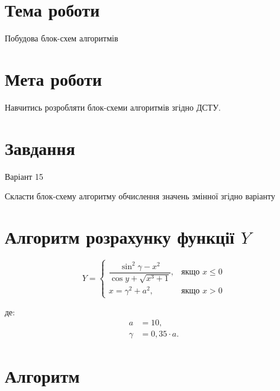 \documentclass[a4paper]{article}
\begin{document}
\section*{Тема роботи}
Побудова блок-схем алгоритмів

\section*{Мета роботи}
Навчитись розробляти блок-схеми алгоритмів згідно ДСТУ.

\section*{Завдання}
Варіант 15

Скласти блок-схему алгоритму обчислення значень змінної згідно варіанту



\section*{Алгоритм розрахунку функції $Y$}

\[
Y = 
\begin{cases}
\dfrac{\sin^2 \gamma - x^2}{\cos y + \sqrt{x^3 + 1}}, & \text{якщо } x \leq 0 \\
x = \gamma^2 + a^2, & \text{якщо } x > 0
\end{cases}
\]

\noindent
де: 
\begin{align*}
    a &= 10, \\
    \gamma &= 0{,}35 \cdot a.
\end{align*}

\section*{Алгоритм}
\end{document}
